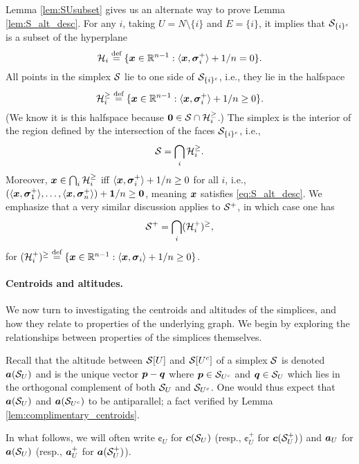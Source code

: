 Lemma \ref{lem:SUsubset} gives us an alternate way to prove Lemma \ref{lem:S_alt_desc}. For any $i$,  taking $U=N\setminus \{i\}$ and $E=\{i\}$, it implies that $\mathcal{S}_{\{i\}^c}$ is a subset of the hyperplane 
\begin{equation}
\label{eq:Hi}
 \mathcal{H}_i\overset{\text{def}}{=} \{\vb*{x}\in\mathbb{R}^{n-1}:\langle \vb*{x},\vb*{\sigma}_i^+\rangle+1/n=0\}.
\end{equation}
All points in the simplex $\mathcal{S}$ lie to one side of $\mathcal{S}_{\{i\}^c}$, i.e., they lie in the halfspace 
\[\mathcal{H}_i^{\geq } \overset{\text{def}}{=} \{\vb*{x}\in\mathbb{R}^{n-1}:\langle \vb*{x},\vb*{\sigma}_i^+\rangle+1/n\geq0\}.\]
(We know it is this halfspace because $\vb{0}\in\mathcal{S}\cap\mathcal{H}_i^{\geq }$.) The simplex is the interior of the region defined by the intersection of the faces $\mathcal{S}_{\{i\}^c}$, i.e.,   
\begin{equation}
\label{eq:splx_bigcapH_i}
    \mathcal{S}=\bigcap_i \mathcal{H}_i^{\geq }.
\end{equation}
Moreover, $\vb*{x}\in \bigcap_i\mathcal{H}_i^{\geq }$ iff $\langle \vb*{x},\vb*{\sigma}_i^+\rangle +1/n\geq 0$ for all $i$, i.e., $(\langle \vb*{x},\vb*{\sigma}_1^+\rangle,\dots,\langle \vb*{x},\vb*{\sigma}_n^+\rangle) + \vb{1}/n\geq \vb{0}$, meaning $\vb*{x}$ satisfies \eqref{eq:S_alt_desc}.  We emphasize that a very similar discussion applies to $\mathcal{S}^+$, in which case one has 
\begin{equation}
\label{eq:splx^+_bigcapH_i}
\mathcal{S}^+=\bigcap_i (\mathcal{H}_i^+)^{\geq },
\end{equation}
for $(\mathcal{H}_i^+)^{\geq } \overset{\text{def}}{=} \{\vb*{x}\in\mathbb{R}^{n-1}:\langle \vb*{x},\vb*{\sigma}_i\rangle + 1/n\geq 0\}$. 


\paragraph{Centroids and altitudes.} 
We now turn to investigating the centroids and altitudes of the simplices, and how they relate to properties of the underlying graph. We begin by exploring the relationships between properties of the simplices themselves. 

Recall that the altitude between $\mathcal{S}[U]$ and $\mathcal{S}[U^c]$ of a simplex $\mathcal{S}$ is denoted $\vb*{a}(\mathcal{S}_U)$ and is the unique vector $\vb*{p}-\vb*{q}$ where  $\vb*{p}\in \mathcal{S}_{U^c}$ and $\vb*{q}\in\mathcal{S}_{U}$ which lies in the orthogonal complement of both $\mathcal{S}_U$ and $\mathcal{S}_{U^c}$. One would thus expect that $\vb*{a}(\mathcal{S}_U)$ and $\vb*{a}(\mathcal{S}_{U^c})$ to be antiparallel; a fact verified by Lemma \ref{lem:complimentary_centroids}.  

In what follows,  we will often write $\cent_U$ for $\vb*{c}(\mathcal{S}_U)$ (resp., $\cent_U^+$ for $\vb*{c}(\mathcal{S}_U^+)$) and $\vb*{a}_U$ for $\vb*{a}(\mathcal{S}_U)$ (resp., $\vb*{a}_U^+$ for $\vb*{a}(\mathcal{S}_U^+)$). 

